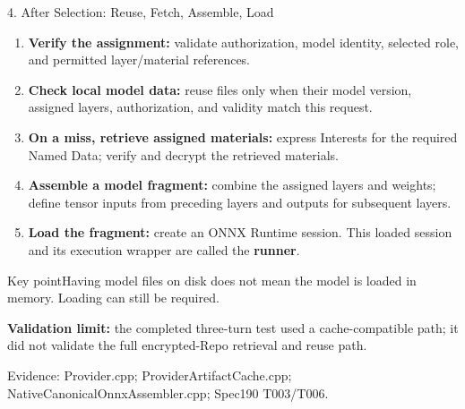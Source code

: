 \documentclass[10pt,aspectratio=169]{beamer}
\newcommand{\src}[1]{\vfill{\fontsize{6.5}{8}\selectfont\color{Gray}Evidence: #1\par}}
\newcommand{\point}[1]{\begin{block}{Key point}\small #1\end{block}}
\begin{document}
\begin{frame}{4. After Selection: Reuse, Fetch, Assemble, Load}
\small
\begin{enumerate}
\item \textbf{Verify the assignment:} validate authorization, model identity, selected role, and permitted layer/material references.
\item \textbf{Check local model data:} reuse files only when their model version, assigned layers, authorization, and validity match this request.
\item \textbf{On a miss, retrieve assigned materials:} express Interests for the required Named Data; verify and decrypt the retrieved materials.
\item \textbf{Assemble a model fragment:} combine the assigned layers and weights; define tensor inputs from preceding layers and outputs for subsequent layers.
\item \textbf{Load the fragment:} create an ONNX Runtime session. This loaded session and its execution wrapper are called the \textbf{runner}.
\end{enumerate}
\point{Having model files on disk does not mean the model is loaded in memory. Loading can still be required.}
\small \textbf{Validation limit:} the completed three-turn test used a cache-compatible path; it did not validate the full encrypted-Repo retrieval and reuse path.
\src{Provider.cpp; ProviderArtifactCache.cpp; NativeCanonicalOnnxAssembler.cpp; Spec190 T003/T006.}
\end{frame}
\end{document}
